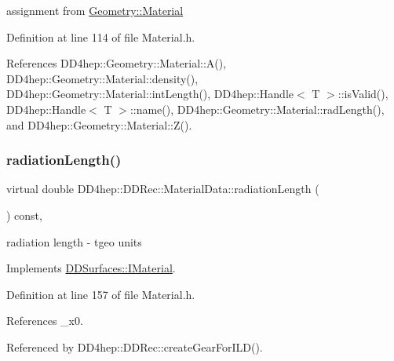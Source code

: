 assignment from \hyperlink{class_d_d4hep_1_1_geometry_1_1_material}{Geometry\+::\+Material} 



Definition at line 114 of file Material.\+h.



References D\+D4hep\+::\+Geometry\+::\+Material\+::\+A(), D\+D4hep\+::\+Geometry\+::\+Material\+::density(), D\+D4hep\+::\+Geometry\+::\+Material\+::int\+Length(), D\+D4hep\+::\+Handle$<$ T $>$\+::is\+Valid(), D\+D4hep\+::\+Handle$<$ T $>$\+::name(), D\+D4hep\+::\+Geometry\+::\+Material\+::rad\+Length(), and D\+D4hep\+::\+Geometry\+::\+Material\+::\+Z().

\hypertarget{class_d_d4hep_1_1_d_d_rec_1_1_material_data_ae0160490acc99fb7b880f687c70f1ec8}{}\label{class_d_d4hep_1_1_d_d_rec_1_1_material_data_ae0160490acc99fb7b880f687c70f1ec8} 
\subsubsection{\texorpdfstring{radiation\+Length()}{radiationLength()}}
{\footnotesize\ttfamily virtual double D\+D4hep\+::\+D\+D\+Rec\+::\+Material\+Data\+::radiation\+Length (\begin{DoxyParamCaption}{ }\end{DoxyParamCaption}) const\hspace{0.3cm}{\ttfamily [inline]}, {\ttfamily [virtual]}}



radiation length -\/ tgeo units 



Implements \hyperlink{class_d_d_surfaces_1_1_i_material_a30bf2290a5f4616d6f0ad5bd2e500300}{D\+D\+Surfaces\+::\+I\+Material}.



Definition at line 157 of file Material.\+h.



References \+\_\+x0.



Referenced by D\+D4hep\+::\+D\+D\+Rec\+::create\+Gear\+For\+I\+L\+D().

\hypertarget{class_d_d4hep_1_1_d_d_rec_1_1_material_data_a8200577f3cab334549373e0dfcc3db3a}{}\label{class_d_d4hep_1_1_d_d_rec_1_1_material_data_a8200577f3cab334549373e0dfcc3db3a} 
